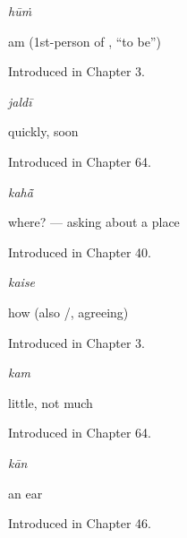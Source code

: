 \noindent\begin{minipage}[t]{\linewidth}
\raggedright
\textbf{}\enspace\emph{hūṁ}\par
\small am (1st-person of , \textquotedblleft{}to be\textquotedblright{})\par
\footnotesize Introduced in Chapter 3.
\end{minipage}\par\medskip

\noindent\begin{minipage}[t]{\linewidth}
\raggedright
\textbf{}\enspace\emph{jaldī}\par
\small quickly, soon\par
\footnotesize Introduced in Chapter 64.
\end{minipage}\par\medskip

\noindent\begin{minipage}[t]{\linewidth}
\raggedright
\textbf{}\enspace\emph{kahā̃}\par
\small where? — asking about a place\par
\footnotesize Introduced in Chapter 40.
\end{minipage}\par\medskip

\noindent\begin{minipage}[t]{\linewidth}
\raggedright
\textbf{}\enspace\emph{kaise}\par
\small how (also /, agreeing)\par
\footnotesize Introduced in Chapter 3.
\end{minipage}\par\medskip

\noindent\begin{minipage}[t]{\linewidth}
\raggedright
\textbf{}\enspace\emph{kam}\par
\small little, not much\par
\footnotesize Introduced in Chapter 64.
\end{minipage}\par\medskip

\noindent\begin{minipage}[t]{\linewidth}
\raggedright
\textbf{}\enspace\emph{kān}\par
\small an ear\par
\footnotesize Introduced in Chapter 46.
\end{minipage}\par\medskip

